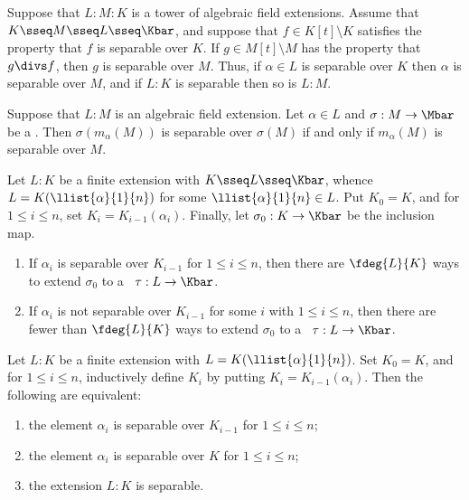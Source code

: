 \documentclass{article}
\begin{document}
  \begin{tproposition}
    Suppose that \( L:M:K \) is a tower of algebraic field extensions.
    Assume that \( K\sseq M\sseq L\sseq \Kbar \), and suppose that \( f\in K[t]\setminus K \) satisfies the property that \( f \) is separable over \( K \).
    If \( g\in M[t]\setminus M \) has the property that \( g\divs f \), then \( g \) is separable over \( M \).
    Thus, if \( \alpha\in L \) is separable over \( K \) then \( \alpha \) is separable over \( M \), and if \( L:K \) is separable then so is \( L:M \).
  \end{tproposition}

  \begin{tproposition}
    Suppose that \( L:M \) is an algebraic field extension.
    Let \( \alpha\in L \) and \( \sigma:M\to\Mbar \) be a \homo.
    Then \( \sigma(m_\alpha(M)) \) is separable over \( \sigma(M) \) if and only if \( m_\alpha(M) \) is separable over \( M \).
  \end{tproposition}

  \begin{ttheorem}
    Let \( L:K \) be a finite extension with \( K\sseq L\sseq \Kbar \), whence \( L=K(\llist{\alpha}{1}{n}) \) for some \( \llist{\alpha}{1}{n}\in L \).
    Put \( K_0=K \), and for \( 1\leq i\leq n \), set \( K_i=K_{i-1}(\alpha_i) \).
    Finally, let \( \sigma_0:K\to\Kbar \) be the inclusion map.
    \begin{enumerate}[label=(\roman*)]
      \item If \( \alpha_i \) is separable over \( K_{i-1} \) for \( 1\leq i\leq n \), then there are \( \fdeg{L}{K} \) ways to extend \( \sigma_0 \) to a \homo~\( \tau:L\to \Kbar \).
      \item If \( \alpha_i \) is not separable over \( K_{i-1} \) for some \( i \) with \( 1\leq i\leq n \), then there are fewer than \( \fdeg{L}{K} \) ways to extend \( \sigma_0 \) to a \homo~\( \tau:L\to \Kbar \).
    \end{enumerate}
  \end{ttheorem}

  \begin{ttheorem}
    Let \( L:K \) be a finite extension with \( L=K(\llist{\alpha}{1}{n}) \).
    Set \( K_0=K \), and for \( 1\leq i\leq n \), inductively define \( K_i \) by putting \( K_i=K_{i-1}(\alpha_i) \).
    Then the following are equivalent: \begin{enumerate}[label=(\roman*)]
      \item the element \( \alpha_i \) is separable over \( K_{i-1} \) for \( 1\leq i\leq n \);
      \item the element \( \alpha_i \) is separable over \( K \) for \( 1\leq i\leq n \);
      \item the extension \( L:K \) is separable.
    \end{enumerate}
  \end{ttheorem}
\end{document}
